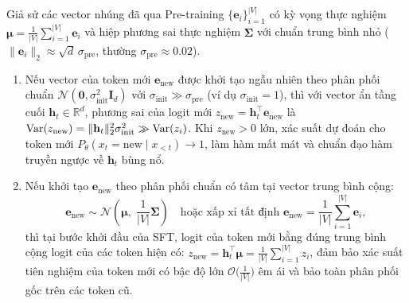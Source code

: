 \begin{theorem}
\label{thm:embedding_init}
Giả sử các vector nhúng đã qua Pre-training $\{\mathbf{e}_i\}_{i=1}^{|V|}$ có kỳ vọng thực nghiệm $\bm{\mu} = \frac{1}{|V|}\sum_{i=1}^{|V|} \mathbf{e}_i$ và hiệp phương sai thực nghiệm $\bm{\Sigma}$ với chuẩn trung bình nhỏ ($\|\mathbf{e}_i\|_2 \approx \sqrt{d}\,\sigma_{\text{pre}}$, thường $\sigma_{\text{pre}} \approx 0.02$).
\begin{enumerate}[label=(\alph*), leftmargin=1.2cm]
    \item Nếu vector của token mới $\mathbf{e}_{\text{new}}$ được khởi tạo ngẫu nhiên theo phân phối chuẩn $\mathcal{N}(\mathbf{0}, \sigma_{\text{init}}^2 \mathbf{I}_d)$ với $\sigma_{\text{init}} \gg \sigma_{\text{pre}}$ (ví dụ $\sigma_{\text{init}} = 1$), thì với vector ẩn tầng cuối $\mathbf{h}_t \in \mathbb{R}^d$, phương sai của logit mới $z_{\text{new}} = \mathbf{h}_t^\top \mathbf{e}_{\text{new}}$ là $\operatorname{\mathrm{Var}}(z_{\text{new}}) = \|\mathbf{h}_t\|_2^2 \sigma_{\text{init}}^2 \gg \operatorname{\mathrm{Var}}(z_i)$. Khi $z_{\text{new}} > 0$ lớn, xác suất dự đoán cho token mới $P_\theta(x_t = \text{new} \mid x_{<t}) \to 1$, làm hàm mất mát và chuẩn đạo hàm truyền ngược về $\mathbf{h}_t$ bùng nổ.
    \item Nếu khởi tạo $\mathbf{e}_{\text{new}}$ theo phân phối chuẩn có tâm tại vector trung bình cộng:
    \begin{equation}
        \mathbf{e}_{\text{new}} \sim \mathcal{N}\left( \bm{\mu},\; \frac{1}{|V|}\bm{\Sigma} \right) \quad \text{hoặc xấp xỉ tất định } \mathbf{e}_{\text{new}} = \frac{1}{|V|}\sum_{i=1}^{|V|} \mathbf{e}_i,
        \label{eq:mean_embedding_init}
    \end{equation}
    thì tại bước khởi đầu của SFT, logit của token mới bằng đúng trung bình cộng logit của các token hiện có: $z_{\text{new}} = \mathbf{h}_t^\top \bm{\mu} = \frac{1}{|V|}\sum_{i=1}^{|V|} z_i$, đảm bảo xác suất tiên nghiệm của token mới có bậc độ lớn $\mathcal{O}\big(\frac{1}{|V|}\big)$ êm ái và bảo toàn phân phối gốc trên các token cũ.
\end{enumerate}
\end{theorem}

